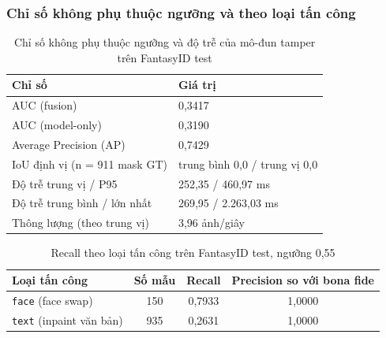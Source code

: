 \documentclass[12pt,a4paper]{article}
\begin{document}
\subsubsection{Chỉ số không phụ thuộc ngưỡng và theo loại tấn công}
\begin{table}[H]
  \centering
  \caption{Chỉ số không phụ thuộc ngưỡng và độ trễ của mô-đun tamper trên FantasyID test}
  \label{tab:tamper-nonthreshold}
  \small
  \begin{tabular}{@{}ll@{}}
    \toprule
    \textbf{Chỉ số} & \textbf{Giá trị}\\
    \midrule
    AUC (fusion) & 0,3417\\
    AUC (model-only) & 0,3190\\
    Average Precision (AP) & 0,7429\\
    IoU định vị (n = 911 mask GT) & trung bình 0,0 / trung vị 0,0\\
    Độ trễ trung vị / P95 & 252,35 / 460,97 ms\\
    Độ trễ trung bình / lớn nhất & 269,95 / 2.263,03 ms\\
    Thông lượng (theo trung vị) & 3,96 ảnh/giây\\
    \bottomrule
  \end{tabular}
\end{table}

\begin{table}[H]
  \centering
  \caption{Recall theo loại tấn công trên FantasyID test, ngưỡng 0,55}
  \label{tab:tamper-attack}
  \small
  \begin{tabular}{@{}lccc@{}}
    \toprule
    \textbf{Loại tấn công} & \textbf{Số mẫu} & \textbf{Recall} & \textbf{Precision so với bona fide}\\
    \midrule
    \texttt{face} (face swap) & 150 & 0,7933 & 1,0000\\
    \texttt{text} (inpaint văn bản) & 935 & 0,2631 & 1,0000\\
    \bottomrule
  \end{tabular}
\end{table}
\end{document}
